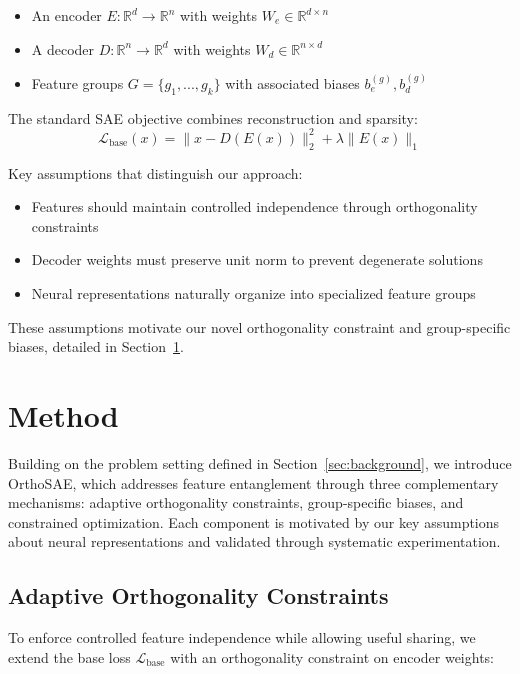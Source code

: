 \documentclass{article} %
\begin{document}
\begin{itemize}
\item An encoder $E: \mathbb{R}^d \rightarrow \mathbb{R}^n$ with weights $W_e \in \mathbb{R}^{d \times n}$
\item A decoder $D: \mathbb{R}^n \rightarrow \mathbb{R}^d$ with weights $W_d \in \mathbb{R}^{n \times d}$
\item Feature groups $G = \{g_1,...,g_k\}$ with associated biases $b_e^{(g)}, b_d^{(g)}$
\end{itemize}

The standard SAE objective combines reconstruction and sparsity:
\begin{equation}
    \mathcal{L}_{\text{base}}(x) = \|x - D(E(x))\|_2^2 + \lambda\|E(x)\|_1
\end{equation}

Key assumptions that distinguish our approach:
\begin{itemize}
\item Features should maintain controlled independence through orthogonality constraints
\item Decoder weights must preserve unit norm to prevent degenerate solutions
\item Neural representations naturally organize into specialized feature groups
\end{itemize}

These assumptions motivate our novel orthogonality constraint and group-specific biases, detailed in Section~\ref{sec:method}.

\section{Method}
\label{sec:method}

Building on the problem setting defined in Section~\ref{sec:background}, we introduce OrthoSAE, which addresses feature entanglement through three complementary mechanisms: adaptive orthogonality constraints, group-specific biases, and constrained optimization. Each component is motivated by our key assumptions about neural representations and validated through systematic experimentation.

\subsection{Adaptive Orthogonality Constraints}
To enforce controlled feature independence while allowing useful sharing, we extend the base loss $\mathcal{L}_{\text{base}}$ with an orthogonality constraint on encoder weights:
\end{document}

